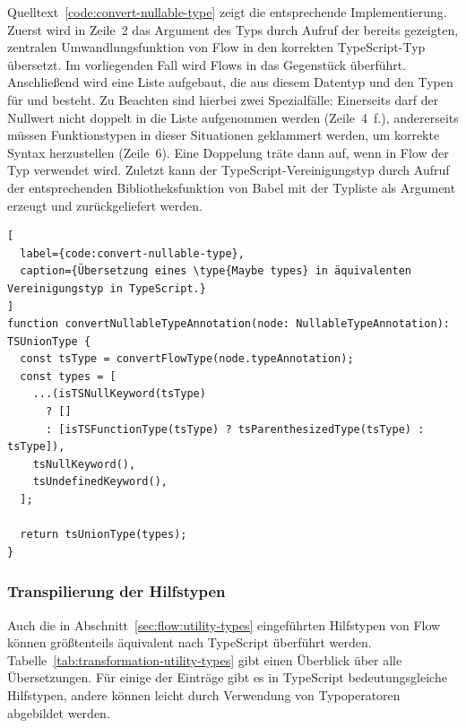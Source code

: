 Quelltext~\ref{code:convert-nullable-type} zeigt die entsprechende Implementierung. Zuerst wird in Zeile~2 das Argument des Typs  durch Aufruf der bereits gezeigten, zentralen Umwandlungsfunktion von Flow in den korrekten TypeScript-Typ übersetzt. Im vorliegenden Fall wird Flows  in das Gegenstück  überführt. Anschließend wird eine Liste aufgebaut, die aus diesem Datentyp und den Typen für  und  besteht. Zu Beachten sind hierbei zwei Spezialfälle: Einerseits darf der Nullwert nicht doppelt in die Liste aufgenommen werden (Zeile~4~f.), andererseits müssen Funktionstypen in dieser Situationen geklammert werden, um korrekte Syntax herzustellen (Zeile~6). Eine Doppelung träte dann auf, wenn in Flow der Typ  verwendet wird. Zuletzt kann der TypeScript-Vereinigungstyp durch Aufruf der entsprechenden Bibliotheksfunktion von Babel mit der Typliste als Argument erzeugt und zurückgeliefert werden.

\begin{lstlisting}[
  label={code:convert-nullable-type},
  caption={Übersetzung eines \type{Maybe types} in äquivalenten Vereinigungstyp in TypeScript.}
]
function convertNullableTypeAnnotation(node: NullableTypeAnnotation): TSUnionType {
  const tsType = convertFlowType(node.typeAnnotation);
  const types = [
    ...(isTSNullKeyword(tsType)
      ? []
      : [isTSFunctionType(tsType) ? tsParenthesizedType(tsType) : tsType]),
    tsNullKeyword(),
    tsUndefinedKeyword(),
  ];

  return tsUnionType(types);
}
\end{lstlisting}

\subsubsection{Transpilierung der Hilfstypen}

Auch die in Abschnitt~\ref{sec:flow:utility-types} eingeführten Hilfstypen von Flow können größtenteils äquivalent nach TypeScript überführt werden. Tabelle~\ref{tab:transformation-utility-types} gibt einen Überblick über alle Übersetzungen. Für einige der Einträge gibt es in TypeScript bedeutungsgleiche Hilfstypen, andere können leicht durch Verwendung von Typoperatoren abgebildet werden.

\tablespace



